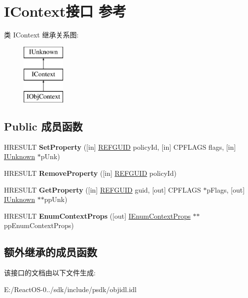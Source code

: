 \hypertarget{interface_i_context}{}\section{I\+Context接口 参考}
\label{interface_i_context}
类 I\+Context 继承关系图\+:\begin{figure}[H]
\begin{center}
\leavevmode
\includegraphics[height=3.000000cm]{interface_i_context}
\end{center}
\end{figure}
\subsection*{Public 成员函数}
\begin{DoxyCompactItemize}
\item 
\mbox{\label{interface_i_context_aa216e98f005abe25752d7e43bb0fc867}} 
H\+R\+E\+S\+U\+LT {\bfseries Set\+Property} (\mbox{[}in\mbox{]} \hyperlink{struct___g_u_i_d}{R\+E\+F\+G\+U\+ID} policy\+Id, \mbox{[}in\mbox{]} C\+P\+F\+L\+A\+GS flags, \mbox{[}in\mbox{]} \hyperlink{interface_i_unknown}{I\+Unknown} $\ast$p\+Unk)
\item 
\mbox{\label{interface_i_context_a5fed3f08153cabafb0933a801535d417}} 
H\+R\+E\+S\+U\+LT {\bfseries Remove\+Property} (\mbox{[}in\mbox{]} \hyperlink{struct___g_u_i_d}{R\+E\+F\+G\+U\+ID} policy\+Id)
\item 
\mbox{\label{interface_i_context_afbb953d9fcfc131bb26ecd563c9fc960}} 
H\+R\+E\+S\+U\+LT {\bfseries Get\+Property} (\mbox{[}in\mbox{]} \hyperlink{struct___g_u_i_d}{R\+E\+F\+G\+U\+ID} guid, \mbox{[}out\mbox{]} C\+P\+F\+L\+A\+GS $\ast$p\+Flags, \mbox{[}out\mbox{]} \hyperlink{interface_i_unknown}{I\+Unknown} $\ast$$\ast$pp\+Unk)
\item 
\mbox{\label{interface_i_context_a477289d8f4e22a5d6e5935cf77061f31}} 
H\+R\+E\+S\+U\+LT {\bfseries Enum\+Context\+Props} (\mbox{[}out\mbox{]} \hyperlink{interface_i_enum_context_props}{I\+Enum\+Context\+Props} $\ast$$\ast$pp\+Enum\+Context\+Props)
\end{DoxyCompactItemize}
\subsection*{额外继承的成员函数}


该接口的文档由以下文件生成\+:\begin{DoxyCompactItemize}
\item 
E\+:/\+React\+O\+S-\/0../sdk/include/psdk/objidl.\+idl\end{DoxyCompactItemize}
